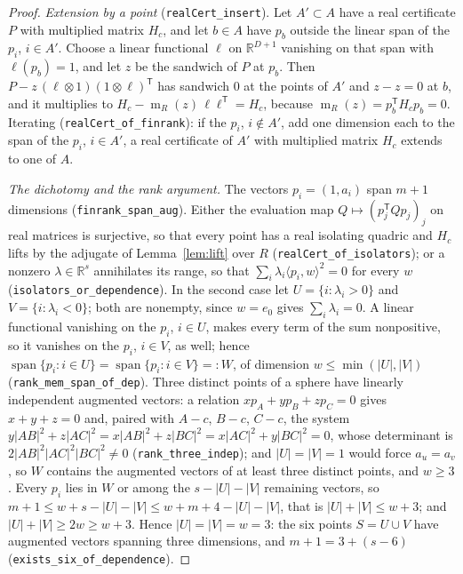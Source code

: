 \documentclass[11pt]{article}
\theoremstyle{definition}
\theoremstyle{remark}
\newcommand{\R}{\mathbb{R}}
\DeclareMathOperator{\m}{m}
\DeclareMathOperator{\spn}{span}
\begin{document}
\begin{proof}
\emph{Extension by a point} (\texttt{realCert\_insert}). Let $A' \subset A$ have a real certificate $P$
with multiplied matrix $H_c$, and let $b \in A$ have $p_b$ outside the linear span of the $p_i$,
$i \in A'$. Choose a linear functional $\ell$ on $\R^{D+1}$ vanishing on that span with $\ell(p_b) = 1$,
and let $z$ be the sandwich of $P$ at $p_b$. Then $P - z\,(\ell \otimes 1)(1 \otimes \ell)^{\mathsf T}$ has
sandwich $0$ at the points of $A'$ and $z - z = 0$ at $b$, and it multiplies to
$H_c - \m_R(z)\, \ell\ell^{\mathsf T} = H_c$, because $\m_R(z) = p_b^{\mathsf T} H_c p_b = 0$. Iterating
(\texttt{realCert\_of\_finrank}): if the $p_i$, $i \notin A'$, add one dimension each to the span of the
$p_i$, $i \in A'$, a real certificate of $A'$ with multiplied matrix $H_c$ extends to one of $A$.

\emph{The dichotomy and the rank argument.} The vectors $p_i = (1, a_i)$ span $m + 1$ dimensions
(\texttt{finrank\_span\_aug}). Either the evaluation map $Q \mapsto (p_j^{\mathsf T} Q p_j)_j$ on real
matrices is surjective, so that every point has a real isolating quadric and $H_c$ lifts by the
adjugate of Lemma~\ref{lem:lift} over $R$ (\texttt{realCert\_of\_isolators}); or a nonzero
$\lambda \in \R^s$ annihilates its range, so that $\sum_i \lambda_i \langle p_i, w\rangle^2 = 0$ for every
$w$ (\texttt{isolators\_or\_dependence}). In the second case let $U = \{i : \lambda_i > 0\}$ and
$V = \{i : \lambda_i < 0\}$; both are nonempty, since $w = e_0$ gives $\sum_i \lambda_i = 0$. A linear
functional vanishing on the $p_i$, $i \in U$, makes every term of the sum nonpositive, so it vanishes
on the $p_i$, $i \in V$, as well; hence $\spn\{p_i : i \in U\} = \spn\{p_i : i \in V\} =: W$, of
dimension $w \leq \min(|U|, |V|)$ (\texttt{rank\_mem\_span\_of\_dep}). Three distinct points of a sphere
have linearly independent augmented vectors: a relation $x p_A + y p_B + z p_C = 0$ gives
$x + y + z = 0$ and, paired with $A - c$, $B - c$, $C - c$, the system
$y|AB|^2 + z|AC|^2 = x|AB|^2 + z|BC|^2 = x|AC|^2 + y|BC|^2 = 0$, whose determinant is
$2|AB|^2|AC|^2|BC|^2 \neq 0$ (\texttt{rank\_three\_indep}); and $|U| = |V| = 1$ would force
$a_u = a_v$, so $W$ contains the augmented vectors of at least three distinct points, and $w \geq 3$. Every $p_i$ lies in $W$ or among the $s - |U| - |V|$ remaining vectors, so
$m + 1 \leq w + s - |U| - |V| \leq w + m + 4 - |U| - |V|$, that is $|U| + |V| \leq w + 3$; and
$|U| + |V| \geq 2w \geq w + 3$. Hence $|U| = |V| = w = 3$: the six points $S = U \cup V$ have augmented vectors spanning three
dimensions, and $m + 1 = 3 + (s - 6)$ (\texttt{exists\_six\_of\_dependence}).


\end{proof}
\end{document}
